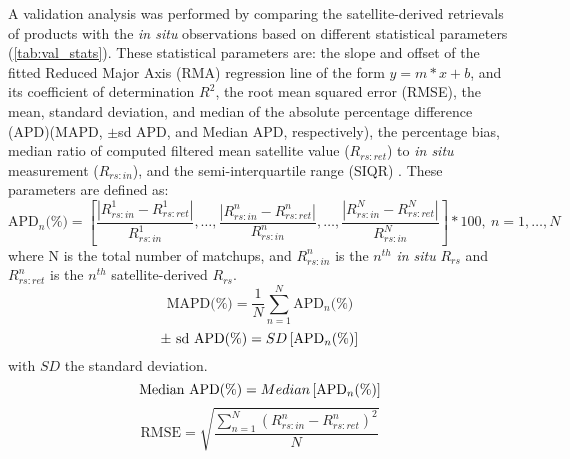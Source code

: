 \documentclass[10pt]{article}
\begin{document}
A validation analysis was performed by comparing the satellite-derived retrievals of products with the {\it in situ} observations based on different statistical parameters (\autoref{tab:val_stats}). These statistical parameters are: the slope and offset of the fitted Reduced Major Axis (RMA) regression line of the form $y=m*x+b$, and its coefficient of determination $R^2$, the root mean squared error (RMSE), the mean, standard deviation, and median of the absolute percentage difference (APD)(MAPD, $\pm$sd APD, and Median APD, respectively), the percentage bias, median ratio of computed filtered mean satellite value ($R_{rs:ret}$) to {\it in situ} measurement ($R_{rs:in}$), and the semi-interquartile range (SIQR) \cite{Bailey2006}. These parameters are defined as:
\begin{equation}
  \text{APD$_n$(\%)}=\left[\frac{\displaystyle \left|R_{rs:in}^1-R_{rs:ret}^1 \right|}{R_{rs:in}^1},\dots,\frac{\displaystyle \left|R_{rs:in}^n-R_{rs:ret}^n \right|}{R_{rs:in}^n},\dots,\frac{\displaystyle \left|R_{rs:in}^N-R_{rs:ret}^N \right|}{R_{rs:in}^N}\right]*100,\ n=1,\dots,N
\end{equation}
\noindent where N is the total number of matchups, and $R_{rs:in}^n$ is the $n^{th}$ {\it in situ} $R_{rs}$ and $R_{rs:ret}^n$ is the $n^{th}$ satellite-derived $R_{rs}$.
\begin{equation}
  \text{MAPD(\%)} = \frac{1}{N} \sum_{n=1}^{N} \text{APD$_n$(\%)}
\end{equation}
\begin{equation}
  \text{$\pm$ \text{sd} APD(\%)} =  SD\left[\text{APD$_n$(\%)}\right]
\end{equation}
\noindent with $SD$ the standard deviation.
\begin{equation}
  \text{\text{Median} APD(\%)} =  Median\left[\text{APD$_n$(\%)}\right]
\end{equation}
\begin{equation}
   \text{RMSE} = \sqrt{\frac{\displaystyle \sum_{n=1}^{N} \left(R_{rs:in}^n-R_{rs:ret}^n\right)^2}{N}}
\end{equation}
\end{document}
